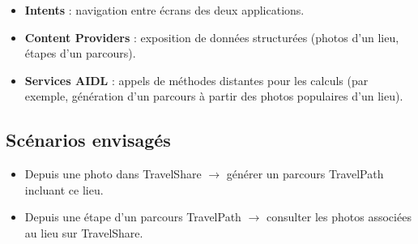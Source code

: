 \documentclass[11pt,a4paper]{article}
\begin{document}
\begin{itemize}
  \item \textbf{Intents} : navigation entre écrans des deux applications.
  \item \textbf{Content Providers} : exposition de données structurées
    (photos d'un lieu, étapes d'un parcours).
  \item \textbf{Services AIDL} : appels de méthodes distantes pour les calculs
    (par exemple, génération d'un parcours à partir des photos populaires d'un lieu).
\end{itemize}

\subsection*{Scénarios envisagés}

\begin{itemize}
  \item Depuis une photo dans TravelShare $\rightarrow$ générer un parcours TravelPath
    incluant ce lieu.
  \item Depuis une étape d'un parcours TravelPath $\rightarrow$ consulter les photos
    associées au lieu sur TravelShare.
\end{itemize}
\end{document}
